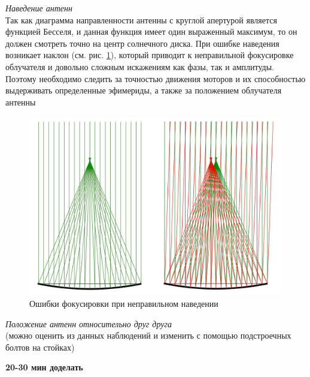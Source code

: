 \begin{list}{-}{\textbf{Аппаратные}}
	\item \textit{Наведение антенн} \\
	Так как диаграмма направленности антенны с круглой апертурой является функцией Бесселя, и данная функция имеет один выраженный максимум, то он должен смотреть точно на центр солнечного диска. При ошибке наведения возникает наклон (см. рис. \ref{fig:искажения при наведении}), который приводит к неправильной фокусировке облучателя и довольно сложным искажениям как фазы, так и амплитуды. Поэтому необходимо следить за точностью движения моторов и их способностью выдерживать определенные эфимериды, а также за положением облучателя антенны
	\begin{figure}[H]
		\centering
		\includegraphics[scale=0.15]{images/globa2.jpg}
		\caption{Ошибки фокусировки при неправильном наведении}
		\label{fig:искажения при наведении}
	\end{figure}

	\item \textit{Положение антенн относительно друг друга}\\ (можно оценить из данных наблюдений и изменить с помощью подстроечных болтов на стойках)

	\textbf{20-30 мин доделать}


\end{list}
